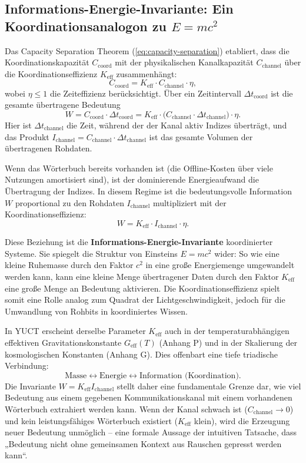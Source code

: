 \documentclass[12pt,a4paper]{article}
\theoremstyle{remark}
\begin{document}
	\subsection{Informations-Energie-Invariante: Ein Koordinationsanalogon zu \(E=mc^2\)}
	\label{subsec:info_energy_invariant}
	
	Das Capacity Separation Theorem (\ref{eq:capacity-separation}) etabliert, dass die Koordinationskapazität \(C_{\text{coord}}\) mit der physikalischen Kanalkapazität \(C_{\text{channel}}\) über die Koordinationseffizienz \(K_{\mathrm{eff}}\) zusammenhängt:
	\[
	C_{\text{coord}} = K_{\mathrm{eff}} \cdot C_{\text{channel}} \cdot \eta,
	\]
	wobei \(\eta \le 1\) die Zeiteffizienz berücksichtigt. Über ein Zeitintervall \(\Delta t_{\text{coord}}\) ist die gesamte übertragene Bedeutung
	\[
	W = C_{\text{coord}} \cdot \Delta t_{\text{coord}} = K_{\mathrm{eff}} \cdot \bigl( C_{\text{channel}} \cdot \Delta t_{\text{channel}} \bigr) \cdot \eta.
	\]
	Hier ist \(\Delta t_{\text{channel}}\) die Zeit, während der der Kanal aktiv Indizes überträgt, und das Produkt \(I_{\text{channel}} = C_{\text{channel}} \cdot \Delta t_{\text{channel}}\) ist das gesamte Volumen der übertragenen Rohdaten.
	
	Wenn das Wörterbuch bereits vorhanden ist (die Offline-Kosten über viele Nutzungen amortisiert sind), ist der dominierende Energieaufwand die Übertragung der Indizes. In diesem Regime ist die bedeutungsvolle Information \(W\) proportional zu den Rohdaten \(I_{\text{channel}}\) multipliziert mit der Koordinationseffizienz:
	\[
	\boxed{W = K_{\mathrm{eff}} \cdot I_{\text{channel}} \cdot \eta}.
	\]
	
	Diese Beziehung ist die \textbf{Informations-Energie-Invariante} koordinierter Systeme. Sie spiegelt die Struktur von Einsteins \(E = m c^2\) wider: So wie eine kleine Ruhemasse durch den Faktor \(c^2\) in eine große Energiemenge umgewandelt werden kann, kann eine kleine Menge übertragener Daten durch den Faktor \(K_{\mathrm{eff}}\) eine große Menge an Bedeutung aktivieren. Die Koordinationseffizienz spielt somit eine Rolle analog zum Quadrat der Lichtgeschwindigkeit, jedoch für die Umwandlung von Rohbits in koordiniertes Wissen.
	
	In YUCT erscheint derselbe Parameter \(K_{\mathrm{eff}}\) auch in der temperaturabhängigen effektiven Gravitationskonstante \(G_{\text{eff}}(T)\) (Anhang P) und in der Skalierung der kosmologischen Konstanten (Anhang G). Dies offenbart eine tiefe triadische Verbindung:
	\[
	\text{Masse} \leftrightarrow \text{Energie} \leftrightarrow \text{Information (Koordination)}.
	\]
	Die Invariante \(W = K_{\mathrm{eff}} I_{\text{channel}}\) stellt daher eine fundamentale Grenze dar, wie viel Bedeutung aus einem gegebenen Kommunikationskanal mit einem vorhandenen Wörterbuch extrahiert werden kann. Wenn der Kanal schwach ist (\(C_{\text{channel}} \to 0\)) und kein leistungsfähiges Wörterbuch existiert (\(K_{\mathrm{eff}}\) klein), wird die Erzeugung neuer Bedeutung unmöglich – eine formale Aussage der intuitiven Tatsache, dass „Bedeutung nicht ohne gemeinsamen Kontext aus Rauschen gepresst werden kann“.
	
\end{document}
